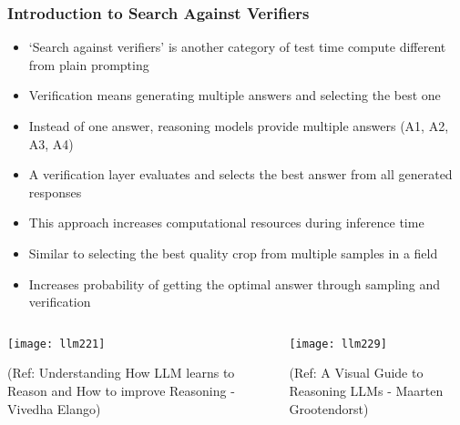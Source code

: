 \begin{frame}[fragile]\frametitle{Introduction to Search Against Verifiers}
      \begin{itemize}
        \item `Search against verifiers' is another category of test time compute different from plain prompting
        \item Verification means generating multiple answers and selecting the best one
        \item Instead of one answer, reasoning models provide multiple answers (A1, A2, A3, A4)
        \item A verification layer evaluates and selects the best answer from all generated responses
        \item This approach increases computational resources during inference time
        \item Similar to selecting the best quality crop from multiple samples in a field
        \item Increases probability of getting the optimal answer through sampling and verification
      \end{itemize}
	  
	  \begin{columns}
    \begin{column}[T]{0.5\linewidth}
        \begin{center}
        \texttt{[image: llm221]}
		
		{\tiny (Ref: Understanding How LLM learns to Reason and How to improve Reasoning - Vivedha Elango)}
        \end{center}	

    \end{column}
    \begin{column}[T]{0.5\linewidth}
		\begin{center}
        \texttt{[image: llm229]}
		
		{\tiny (Ref: A Visual Guide to Reasoning LLMs - Maarten Grootendorst)}
		
		\end{center}
    \end{column}
  \end{columns}
  
	  
\end{frame}

